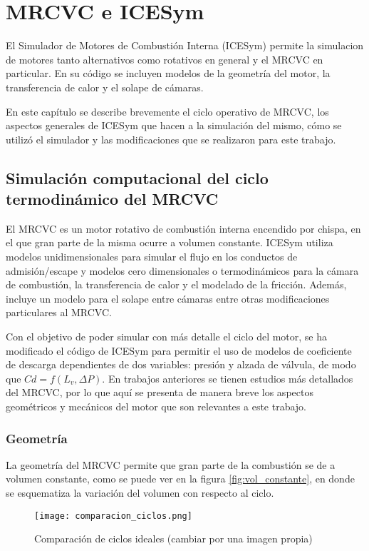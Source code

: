 \chapter{MRCVC e ICESym}

El Simulador de Motores de Combustión Interna (ICESym) permite la simulacion de
motores tanto alternativos como rotativos en general y el MRCVC en particular.
%
En su código se incluyen modelos de la geometría del motor, la transferencia
de calor y el solape de cámaras.

En este capítulo se describe brevemente el ciclo operativo de MRCVC, los
aspectos generales de ICESym que hacen a la simulación del mismo, cómo se
utilizó el simulador y las modificaciones que se realizaron para este trabajo.

\section{Simulación computacional del ciclo termodinámico del MRCVC}

El MRCVC es un motor rotativo de combustión interna encendido por chispa, en el
que gran parte de la misma ocurre a volumen constante.
%
ICESym utiliza modelos unidimensionales para simular el flujo en los conductos
de admisión/escape y modelos cero dimensionales o termodinámicos para la cámara
de combustión, la transferencia de calor y el modelado de la fricción.
%
Además, incluye un modelo para el solape entre cámaras \cite{lopez16} entre
otras modificaciones particulares al MRCVC.

Con el objetivo de poder simular con más detalle el ciclo del motor, se ha
modificado el código de ICESym para permitir el uso de modelos de coeficiente
de descarga dependientes de dos variables: presión y alzada de válvula, de modo
que $Cd = f(L_v, \Delta P)$.
%
En trabajos anteriores se tienen estudios más detallados del MRCVC, por lo que
aquí se presenta de manera breve los aspectos geométricos y mecánicos del motor
que son relevantes a este trabajo.

\subsection{Geometría}
%
La geometría del MRCVC permite que gran parte de la combustión se de a volumen
constante\cite{mrcvc_geom}, como se puede ver en la figura \ref{fig:vol_constante},
en donde se esquematiza la variación del volumen con respecto al ciclo.

\begin{figure}
    \centering
    \texttt{[image: comparacion\_ciclos.png]}
    \caption{Comparación de ciclos ideales (cambiar por una imagen propia)}
    \label{fig:comparacion_ciclos}
\end{figure}


